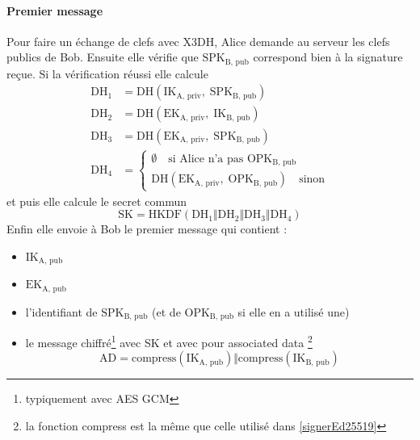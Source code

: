 \documentclass[a4paper, 12pt]{article}
\begin{document}
\paragraph{Premier message}
Pour faire un échange de clefs avec X3DH, Alice demande au serveur les clefs publics de Bob. Ensuite elle vérifie que $\text{SPK}_{\text{B, pub}}$ correspond bien à la signature reçue. Si la vérification réussi elle calcule 
\begin{align*}
	\text{DH}_1 &= \hyperref[DH]{\text{DH}}\left(\text{IK}_{\text{A, priv}}, \;\text{SPK}_{\text{B, pub}}\right)\\
	\text{DH}_2 &= \hyperref[DH]{\text{DH}}\left(\text{EK}_{\text{A, priv}}, \;\text{IK}_{\text{B, pub}}\right)\\
	\text{DH}_3 &= \hyperref[DH]{\text{DH}}\left(\text{EK}_{\text{A, priv}}, \;\text{SPK}_{\text{B, pub}}\right)\\
	\text{DH}_4 &= \begin{cases}\emptyset \quad\text{si Alice n'a pas $\text{OPK}_{\text{B, pub}}$}\\\hyperref[DH]{\text{DH}}\left(\text{EK}_{\text{A, priv}}, \;\text{OPK}_{\text{B, pub}}\right) \quad\text{sinon}\end{cases}
\end{align*}
et puis elle calcule le secret commun 
$$\text{SK} = \hyperref[HKDF]{\text{HKDF}}\left(\text{DH}_1\hyperref[concat]{\Vert}\text{DH}_2\hyperref[concat]{\Vert}\text{DH}_3\hyperref[concat]{\Vert}\text{DH}_4\right)$$
Enfin elle envoie à Bob le premier message qui contient :
\begin{itemize}
	\item $\text{IK}_{\text{A, pub}}$
	\item $\text{EK}_{\text{A, pub}}$
	\item l'identifiant de $\text{SPK}_{\text{B, pub}}$ (et de $\text{OPK}_{\text{B, pub}}$ si elle en a utilisé une)
	\item le message chiffré\footnote{typiquement avec AES GCM} avec SK et avec pour associated data \footnote{la fonction compress est la même que celle utilisé dans \ref{signerEd25519}}
$$\text{AD} = \text{compress}(\text{IK}_{\text{A, pub}}) \hyperref[concat]{\Vert} \text{compress}(\text{IK}_{\text{B, pub}})$$\end{itemize}
\end{document}
